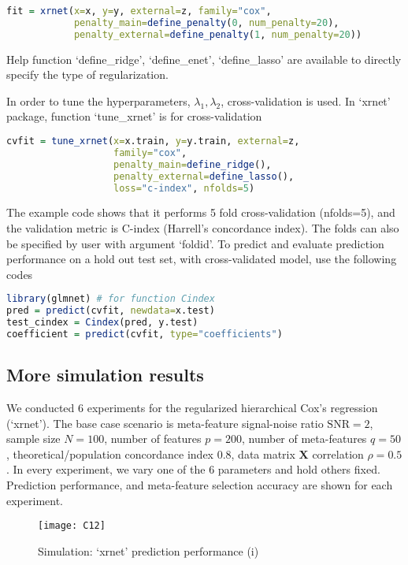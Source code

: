 \begin{lstlisting}[language=R]
fit = xrnet(x=x, y=y, external=z, family="cox",
            penalty_main=define_penalty(0, num_penalty=20),
            penalty_external=define_penalty(1, num_penalty=20))
\end{lstlisting}
Help function `define\_ridge', `define\_enet', `define\_lasso' are available to directly specify the type of regularization. 

In order to tune the hyperparameters, $\lambda_1, \lambda_2$, cross-validation is used. In `xrnet' package, function `tune\_xrnet' is for cross-validation

\begin{lstlisting}[language=R]
cvfit = tune_xrnet(x=x.train, y=y.train, external=z, 
                   family="cox",
                   penalty_main=define_ridge(), 
                   penalty_external=define_lasso(),
                   loss="c-index", nfolds=5)
\end{lstlisting}
The example code shows that it performs 5 fold cross-validation (nfolds=5), and the validation metric is C-index (Harrell's concordance index). The folds can also be specified by user with argument `foldid'. To predict and evaluate prediction performance on a hold out test set, with cross-validated model, use the following codes

\begin{lstlisting}[language=R]
library(glmnet) # for function Cindex
pred = predict(cvfit, newdata=x.test)
test_cindex = Cindex(pred, y.test)
coefficient = predict(cvfit, type="coefficients")
\end{lstlisting}

\subsection{More simulation results}
We conducted 6 experiments for the regularized hierarchical Cox's regression (`xrnet'). The base case scenario is meta-feature signal-noise ratio $\text{SNR}=2$, sample size $N=100$, number of features $p=200$, number of meta-features $q=50$, theoretical/population concordance index 0.8, data matrix $\bm{X}$ correlation $\rho=0.5$. In every experiment, we vary one of the 6 parameters and hold others fixed. Prediction performance, and meta-feature selection accuracy are shown for each experiment.
\begin{figure}[H]
    \texttt{[image: C12]}
    \caption{Simulation: `xrnet' prediction performance (i)}
    \label{fig:C12}
\end{figure} 

